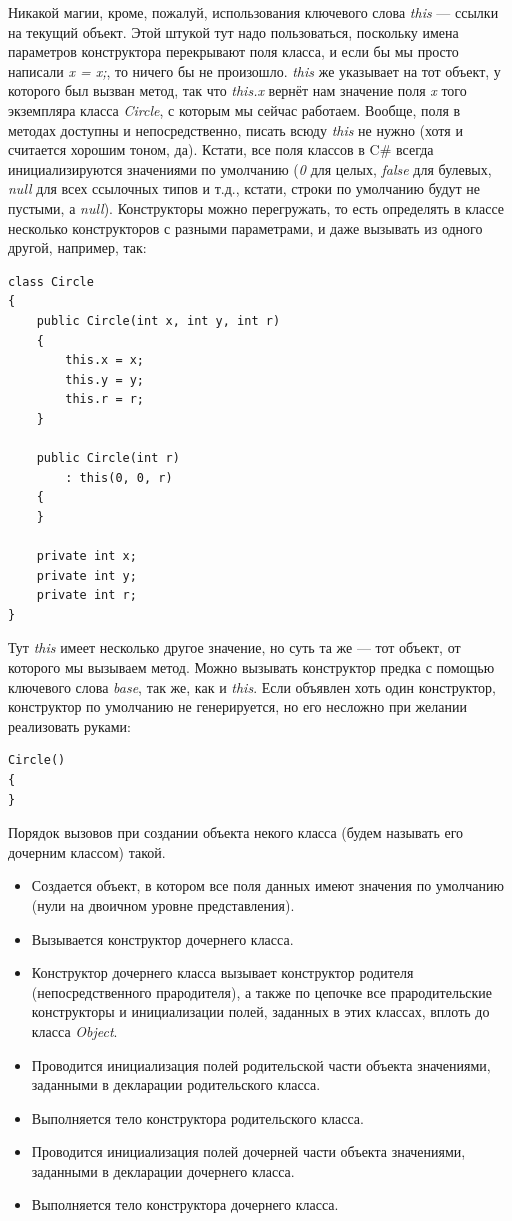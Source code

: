 \documentclass[a5paper]{article}
\begin{document}
Никакой магии, кроме, пожалуй, использования ключевого слова \textit{this} --- ссылки на текущий объект. Этой штукой тут надо пользоваться, поскольку имена параметров конструктора перекрывают поля класса, и если бы мы просто написали \textit{x = x;}, то ничего бы не произошло. \textit{this} же указывает на тот объект, у которого был вызван метод, так что \textit{this.x} вернёт нам значение поля \textit{x} того экземпляра класса \textit{Circle}, с которым мы сейчас работаем. Вообще, поля в методах доступны и непосредственно, писать всюду \textit{this} не нужно (хотя и считается хорошим тоном, да). Кстати, все поля классов в C\# всегда инициализируются значениями по умолчанию (\textit{0} для целых, \textit{false} для булевых, \textit{null} для всех ссылочных типов и т.д., кстати, строки по умолчанию будут не пустыми, а \textit{null}). Конструкторы можно перегружать, то есть определять в классе несколько конструкторов с разными параметрами, и даже вызывать из одного другой, например, так:

\begin{verbatim}
class Circle
{
    public Circle(int x, int y, int r)
    {
        this.x = x;
        this.y = y;
        this.r = r;
    }

    public Circle(int r)
        : this(0, 0, r)
    {
    }

    private int x;
    private int y;
    private int r;
}
\end{verbatim}

Тут \textit{this} имеет несколько другое значение, но суть та же --- тот объект, от которого мы вызываем метод. Можно вызывать конструктор предка с помощью ключевого слова \textit{base}, так же, как и \textit{this}. Если объявлен хоть один конструктор, конструктор по умолчанию не генерируется, но его несложно при желании реализовать руками: 

\begin{verbatim}
Circle()
{
}
\end{verbatim}

Порядок вызовов при создании объекта некого класса (будем называть его дочерним классом) такой.
\begin{itemize}
    \item Создается объект, в котором все поля данных имеют значения по умолчанию (нули на двоичном уровне представления).
    \item Вызывается конструктор дочернего класса.
    \item Конструктор дочернего класса вызывает конструктор родителя (непосредственного прародителя), а также по цепочке все прародительские конструкторы и инициализации полей, заданных в этих классах, вплоть до класса \textit{Object}.
    \item Проводится инициализация полей родительской части объекта значениями, заданными в декларации родительского класса.
    \item Выполняется тело конструктора родительского класса.
    \item Проводится инициализация полей дочерней части объекта значениями, заданными в декларации дочернего класса.
    \item Выполняется тело конструктора дочернего класса.
\end{itemize}
\end{document}

